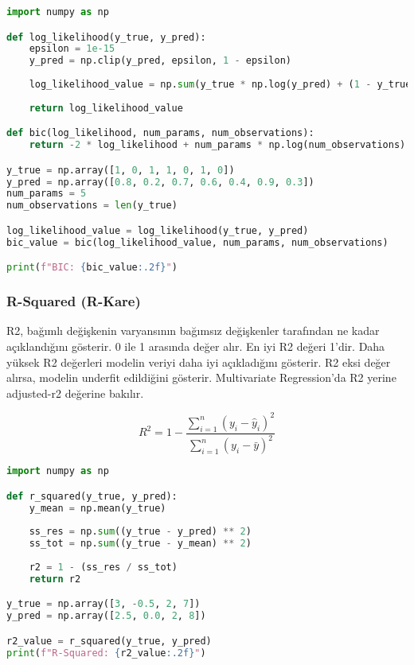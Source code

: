 \begin{lstlisting}[language=Python]
import numpy as np

def log_likelihood(y_true, y_pred):
    epsilon = 1e-15
    y_pred = np.clip(y_pred, epsilon, 1 - epsilon)
    
    log_likelihood_value = np.sum(y_true * np.log(y_pred) + (1 - y_true) * np.log(1 - y_pred))
    
    return log_likelihood_value

def bic(log_likelihood, num_params, num_observations):
    return -2 * log_likelihood + num_params * np.log(num_observations)

y_true = np.array([1, 0, 1, 1, 0, 1, 0])
y_pred = np.array([0.8, 0.2, 0.7, 0.6, 0.4, 0.9, 0.3])
num_params = 5
num_observations = len(y_true)

log_likelihood_value = log_likelihood(y_true, y_pred)
bic_value = bic(log_likelihood_value, num_params, num_observations)

print(f"BIC: {bic_value:.2f}")
\end{lstlisting}

\newpage

\subsubsection{R-Squared (R-Kare)}

R2, bağımlı değişkenin varyansının bağımsız değişkenler tarafından ne kadar açıklandığını gösterir. 0 ile 1 arasında değer alır. En iyi R2 değeri 1'dir. Daha yüksek R2 değerleri modelin veriyi daha iyi açıkladığını gösterir. R2 eksi değer alırsa, modelin underfit edildiğini gösterir. Multivariate Regression'da R2 yerine adjusted-r2 değerine bakılır.

\[R^2 = 1 - \frac{\sum_{i=1}^{n} (y_i - \hat{y}_i)^2}{\sum_{i=1}^{n} (y_i - \bar{y})^2}\]

\begin{lstlisting}[language=Python]
import numpy as np

def r_squared(y_true, y_pred):
    y_mean = np.mean(y_true)
    
    ss_res = np.sum((y_true - y_pred) ** 2)
    ss_tot = np.sum((y_true - y_mean) ** 2)
    
    r2 = 1 - (ss_res / ss_tot)
    return r2

y_true = np.array([3, -0.5, 2, 7])
y_pred = np.array([2.5, 0.0, 2, 8])

r2_value = r_squared(y_true, y_pred)
print(f"R-Squared: {r2_value:.2f}")
\end{lstlisting}

